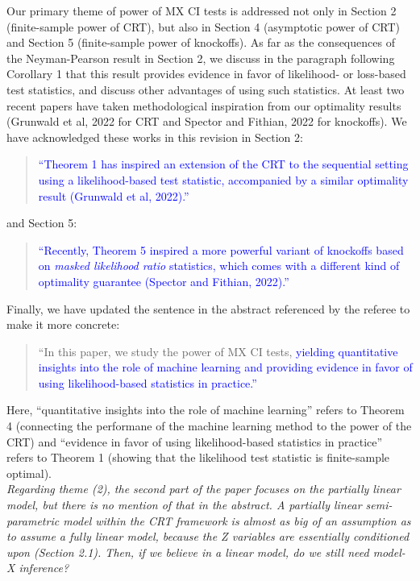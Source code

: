 \documentclass[12pt]{article}
\begin{document}
\noindent Our primary theme of power of MX CI tests is addressed not only in Section 2 (finite-sample power of CRT), but also in Section 4 (asymptotic power of CRT) and Section 5 (finite-sample power of knockoffs). As far as the consequences of the Neyman-Pearson result in Section 2, we discuss in the paragraph following Corollary 1 that this result provides evidence in favor of likelihood- or loss-based test statistics, and discuss other advantages of using such statistics. At least two recent papers have taken methodological inspiration from our optimality results (Grunwald et al, 2022 for CRT and Spector and Fithian, 2022 for knockoffs). We have acknowledged these works in this revision in Section 2:
\begin{quote}
	\textcolor{blue}{``Theorem 1 has inspired an extension of the CRT to the sequential setting using a likelihood-based test statistic, accompanied by a similar optimality result (Grunwald et al, 2022).''}
\end{quote}
and Section 5:
\begin{quote}
	\textcolor{blue}{``Recently, Theorem 5 inspired a more powerful variant of knockoffs based on \textit{masked likelihood ratio} statistics, which comes with a different kind of optimality guarantee (Spector and Fithian, 2022).''}
\end{quote}
Finally, we have updated the sentence in the abstract referenced by the referee to make it more concrete:
\begin{quote}
	``In this paper, we study the power of MX CI tests, \textcolor{blue}{yielding quantitative insights into the role of machine learning and providing evidence in favor of using likelihood-based statistics in practice.''}
\end{quote}
Here, ``quantitative insights into the role of machine learning'' refers to Theorem 4 (connecting the performane of the machine learning method to the power of the CRT) and ``evidence in favor of using likelihood-based statistics in practice'' refers to Theorem 1 (showing that the likelihood test statistic is finite-sample optimal).
\\

\textsl{Regarding theme (2), the second part of the paper focuses on the partially linear model, but there is no mention of that in the abstract. A partially linear semi-parametric model within the CRT framework is almost as big of an assumption as to assume a fully linear model, because the Z variables are essentially conditioned upon (Section 2.1). Then, if we believe in a linear model, do we still need model-X inference?}
\\
\end{document}
